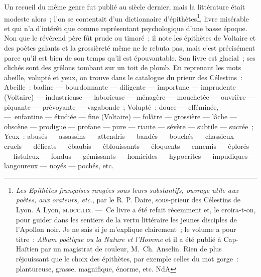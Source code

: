 \documentclass[french,twoside]{book} %
\begin{document}
Un recueil du même genre fut publié au siècle dernier, mais la littérature était modeste alors ; l’on se contentait d’un dictionnaire d’épithètes\footnote{ {\itshape Les Epithètes françaises rangées sous leurs substantifs, ouvrage utile aux poètes, aux orateurs, etc}., par le R. P. Daire, sous-prieur des Célestins de Lyon. A Lyon, \textsc{m.dcc.lix}. — Ce livre a été refait récemment et, le croira-t-on, pour guider dans les sentiers de la vertu littéraire les jeunes disciples de l’Apollon noir. Je ne sais si je m’explique clairement ; le volume a pour titre : {\itshape Album poétique ou la Nature et l’Homme} et il a été publié à Cap-Haïtien par un magistrat de couleur, M. Ch. Anselin. Rien de plus réjouissant que le choix des épithètes, par exemple celles du mot gorge : plantureuse, grasse, magnifique, énorme, etc. NdA}, livre misérable et qui n’a d’intérêt que comme représentant psychologique d’une basse époque. Non que le révérend père fût prude ou timoré ; il note les épithètes de Voltaire et des poètes galants et la grossièreté même ne le rebuta pas, mais c’est précisément parce qu’il est bien de son temps qu’il est épouvantable. Son livre est glacial ; ses clichés sont des grêlons tombant sur un toit de plomb. En reprenant les mots abeille, volupté et yeux, on trouve dans le catalogue du prieur des Célestins : Abeille : badine — bourdonnante — diligente — importune — imprudente (Voltaire) — industrieuse — laborieuse — ménagère — mouchetée — ouvrière — piquante — prévoyante — vagabonde ; Volupté : douce — efféminée, — enfantine — étudiée — fine (Voltaire) — folâtre — grossière — lâche — obscène — prodigue — profane — pure — riante — sévère — subtile — sucrée ; Yeux : abusés — assassins — attendris — bandés — bouchés — chassieux — cruels — délicats — ébaubis — éblouissants — éloquents — ennemis — éplorés — fistuleux — fondus — gémissants — homicides — hypocrites — impudiques — langoureux — noyés — pochés, etc.\par
\end{document}
